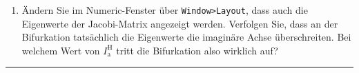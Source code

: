 \documentclass[11pt,a4paper]{article}
\begin{document}
\begin{aufg}
\begin{enumerate}
\item \"Andern Sie im Numeric-Fenster \"uber \texttt{Window>Layout}, dass auch
die Eigenwerte der Jacobi-Matrix angezeigt werden. Verfolgen Sie, dass an der
Bifurkation tats\"achlich die Eigenwerte die imagin\"are Achse \"uberschreiten.
Bei welchem Wert von $I_{\textrm{a}}^{\textrm{H}}$ tritt die Bifurkation also
wirklich auf?
\end{enumerate}
\end{aufg}


\medskip
\hrule

\end{document}
